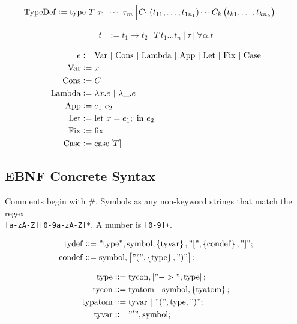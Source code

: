 \documentclass[12pt]{article}
\newcommand{\beq}{::=}
\newcommand{\bs}[1]{\mathrm{#1}}
\newcommand{\bstr}[1]{\mathrm{"#1"}}
\begin{document}
\begin{align}
  \mathrm{TypeDef} &:= \mathrm{type}~T~\tau_1~\cdots~\tau_m \sbr{
                     C_1\del{t_{11},\ldots,t_{1n_1}} 
                     \cdots
                     C_k\del{t_{k1},\ldots,t_{kn_k}}
                     } \label{eq:typedef}
\end{align}

\begin{align}
  t &:= t_1 \to t_2 ~|~ T~t_1 \ldots t_n ~|~ \tau ~|~ \forall \alpha. t
\end{align}

\begin{align}
  e &:= \mathrm{Var} ~|~ \mathrm{Cons} ~|~ \mathrm{Lambda} ~|~ \mathrm{App} ~|~ \mathrm{Let} ~|~ \mathrm{Fix} ~|~ \mathrm{Case}\\
  \mathrm{Var} &:= x\\
  \mathrm{Cons} &:= C\\
  \mathrm{Lambda} &:= \lambda x. e ~|~ \lambda \_. e\\
  \mathrm{App} &:= e_1~e_2\\
  \mathrm{Let} &:= \mathrm{let}~x = e_1;~\mathrm{in}~e_2\\
  \mathrm{Fix} &:= \mathrm{fix}\\
  \mathrm{Case} &:= \mathrm{case}\sbr{T}
\end{align}




\subsection{EBNF Concrete Syntax}

Comments begin with \#.
Symbols as any non-keyword strings that match the regex\\
\verb~[a-zA-Z][0-9a-zA-Z]*~.
A number is \verb~[0-9]+~.

\begin{align}
  \bs{tydef} &\beq \bstr{type}, \bs{symbol}, \cbr{\bs{tyvar}},
               \bstr{[}, \cbr{\bs{condef}}, \bstr{]} ;\\
  \bs{condef} &\beq \bs{symbol}, \sbr{\bstr{(}, \cbr{\bs{type}}, \bstr{)}} ;
\end{align}

\begin{align}
  \bs{type} &\beq \bs{tycon}, \sbr{\bstr{->}, \bs{type}} ;\\
  \bs{tycon} &\beq \bs{tyatom} ~|~ \bs{symbol}, \cbr{\bs{tyatom}} ;\\
  \bs{typatom} &\beq \bs{tyvar} ~|~ \bstr{(}, \bs{type}, \bstr{)} ;\\
  \bs{tyvar} &\beq \bstr{'}, \bs{symbol} ;
\end{align}
\end{document}
